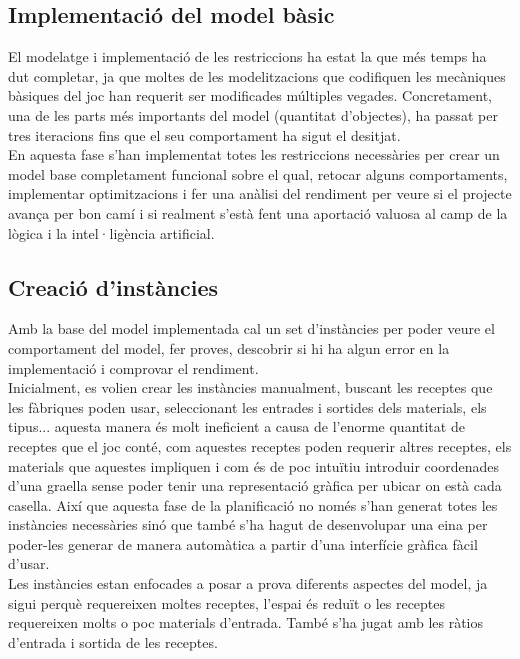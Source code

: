 \subsection{Implementació del model bàsic}
El modelatge i implementació de les restriccions ha estat la que més temps ha dut completar, ja que moltes de les modelitzacions que codifiquen les mecàniques bàsiques del joc han requerit ser modificades múltiples vegades. Concretament, una de les parts més importants del model (quantitat d'objectes), ha passat per tres iteracions fins que el seu comportament ha sigut el desitjat.\\
En aquesta fase s'han implementat totes les restriccions necessàries per crear un model base completament funcional sobre el qual, retocar alguns comportaments, implementar optimitzacions i fer una anàlisi del rendiment per veure si el projecte avança per bon camí i si realment s'està fent una aportació valuosa al camp de la lògica i la intel·ligència artificial.

\subsection{Creació d'instàncies}
Amb la base del model implementada cal un set d'instàncies per poder veure el comportament del model, fer proves, descobrir si hi ha algun error en la implementació i comprovar el rendiment.\\
Inicialment, es volien crear les instàncies manualment, buscant les receptes que les fàbriques poden usar, seleccionant les entrades i sortides dels materials, els tipus... aquesta manera és molt ineficient a causa de l'enorme quantitat de receptes que el joc conté, com aquestes receptes poden requerir altres receptes, els materials que aquestes impliquen i com és de poc intuïtiu introduir coordenades d'una graella sense poder tenir una representació gràfica per ubicar on està cada casella. Així que aquesta fase de la planificació no només s'han generat totes les instàncies necessàries sinó que també s'ha hagut de desenvolupar una eina per poder-les generar de manera automàtica a partir d'una interfície gràfica fàcil d'usar.\\
Les instàncies estan enfocades a posar a prova diferents aspectes del model, ja sigui perquè requereixen moltes receptes, l'espai és reduït o les receptes requereixen molts o poc materials d'entrada. També s'ha jugat amb les ràtios d'entrada i sortida de les receptes.

